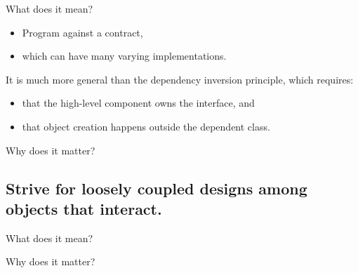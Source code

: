 \documentclass{beamer}
\begin{document}
\begin{frame}{What does it mean?}
    \begin{itemize}
        \item Program against a contract, 
        \item which can have many varying implementations.
    \end{itemize}
    \par It is much more general than the dependency inversion principle, which requires:
    \begin{itemize}
        \item that the high-level component owns the interface, and
        \item that object creation happens outside the dependent class.
    \end{itemize}
\end{frame}

\begin{frame}{Why does it matter?}
\end{frame}

\begin{frame}{}
    
\end{frame}

\begin{frame}{}
    
\end{frame}

\subsection{Strive for loosely coupled designs among objects that interact.}

\begin{frame}{What does it mean?}
\end{frame}

\begin{frame}{Why does it matter?}
\end{frame}

\begin{frame}{}
    
\end{frame}

\begin{frame}{}
    
\end{frame}
\end{document}
